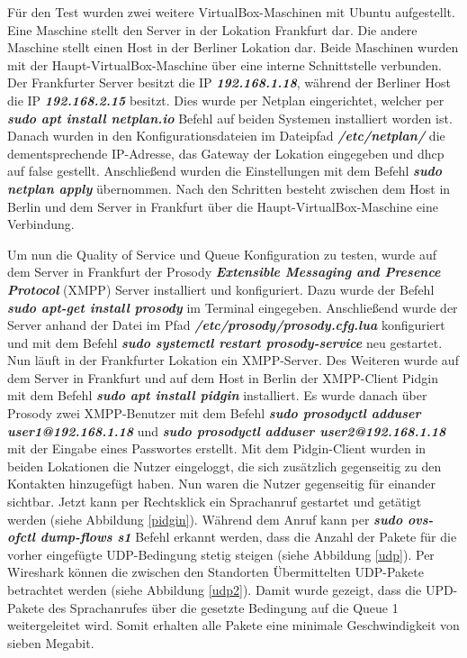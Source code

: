\documentclass[fontsize=12pt,paper=a4,open=any,parskip=half,
  twoside=false,toc=listof,toc=bibliography,fleqn,leqno,
  captions=nooneline,captions=tableabove,british]{scrbook}
\begin{document}
Für den Test wurden zwei weitere VirtualBox-Maschinen mit Ubuntu aufgestellt. Eine Maschine stellt den Server in der Lokation Frankfurt dar. Die andere Maschine stellt einen Host in der Berliner Lokation dar. Beide Maschinen wurden mit der Haupt-VirtualBox-Maschine über eine interne Schnittstelle verbunden. Der Frankfurter Server besitzt die IP \textit{\textbf{192.168.1.18}}, während der Berliner Host die IP \textit{\textbf{192.168.2.15}} besitzt. Dies wurde per Netplan eingerichtet, welcher per \textit{\textbf{sudo apt install netplan.io}} Befehl auf beiden Systemen installiert worden ist. Danach wurden in den Konfigurationsdateien im Dateipfad \textit{\textbf{/etc/netplan/}} die dementsprechende IP-Adresse, das Gateway der Lokation eingegeben und dhcp auf false gestellt. Anschließend wurden die Einstellungen mit dem Befehl \textit{\textbf{sudo netplan apply}} übernommen. Nach den Schritten besteht zwischen dem Host in Berlin und dem Server in Frankfurt über die Haupt-VirtualBox-Maschine eine Verbindung.\par
Um nun die Quality of Service und Queue Konfiguration zu testen, wurde auf dem Server in Frankfurt der Prosody \textit{\textbf{Extensible Messaging and Presence Protocol}} (XMPP) Server installiert und konfiguriert. Dazu wurde der Befehl \textit{\textbf{sudo apt-get install prosody}} im Terminal eingegeben. Anschließend wurde der Server anhand der Datei im Pfad \textit{\textbf{/etc/prosody/prosody.cfg.lua}} konfiguriert und mit dem Befehl \textit{\textbf{sudo systemctl restart prosody-service}} neu gestartet. Nun läuft in der Frankfurter Lokation ein XMPP-Server. Des Weiteren wurde auf dem Server in Frankfurt und auf dem Host in Berlin der XMPP-Client Pidgin mit dem Befehl \textit{\textbf{sudo apt install pidgin}} installiert. Es wurde danach über Prosody zwei XMPP-Benutzer mit dem Befehl \textit{\textbf{sudo prosodyctl adduser user1@192.168.1.18}} und \textit{\textbf{sudo prosodyctl adduser user2@192.168.1.18}} mit der Eingabe eines Passwortes erstellt. Mit dem Pidgin-Client wurden in beiden Lokationen die Nutzer eingeloggt, die sich zusätzlich gegenseitig zu den Kontakten hinzugefügt haben. Nun waren die Nutzer gegenseitig für einander sichtbar. Jetzt kann per Rechtsklick ein Sprachanruf gestartet und getätigt werden (siehe Abbildung \ref{pidgin}). Während dem Anruf kann per \textit{\textbf{sudo ovs-ofctl dump-flows s1}} Befehl erkannt werden, dass die Anzahl der Pakete für die vorher eingefügte UDP-Bedingung stetig steigen (siehe Abbildung \ref{udp}). Per Wireshark können die zwischen den Standorten Übermittelten UDP-Pakete betrachtet werden (siehe Abbildung \ref{udp2}). Damit wurde gezeigt, dass die UPD-Pakete des Sprachanrufes über die gesetzte Bedingung auf die Queue 1 weitergeleitet wird. Somit erhalten alle Pakete eine minimale Geschwindigkeit von sieben Megabit.
\end{document}
